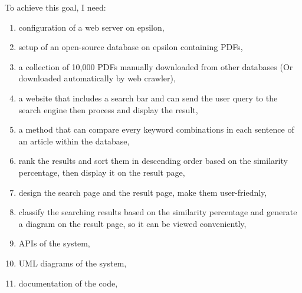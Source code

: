 
  To achieve this goal, I need:
\begin{enumerate}
  \item configuration of a web server on epsilon,
  \item setup of an open-source database on epsilon containing PDFs,
  \item a collection of 10,000 PDFs manually downloaded from other databases (Or downloaded automatically by web crawler),
  \item a website that includes a search bar and can send the user query to the search engine then process and display the result,
  \item a method that can compare every keyword combinations in each sentence of an article within the database,
  \item rank the results and sort them in descending order based on the similarity percentage, then display it on the result page,
  \item design the search page and the result page, make them  user-friednly,
  \item classify the searching results based on the similarity percentage and generate a diagram on the result page, so it can be viewed conveniently,
  \item APIs of the system,
  \item UML diagrams of the system,
  \item documentation of the code, 
\end{enumerate}
